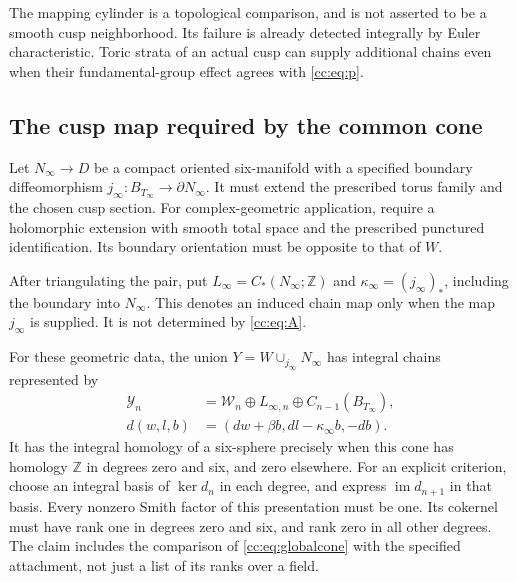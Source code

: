 The mapping cylinder is a topological comparison, and is not asserted
to be a smooth cusp neighborhood. Its failure is already detected
integrally by Euler characteristic. Toric strata of an actual cusp can
supply additional chains even when their fundamental-group effect
agrees with \eqref{cc:eq:p}.

\subsection{The cusp map required by the common cone}

Let $N_\infty\to D$ be a compact oriented six-manifold with a specified
boundary diffeomorphism $j_\infty:B_{T_\infty}\to\partial N_\infty$.
It must extend the prescribed torus family and the chosen cusp section.
For complex-geometric application, require a holomorphic extension with
smooth total space and the prescribed punctured identification.
Its boundary orientation must be opposite to that of $W$.

After triangulating the pair, put $L_\infty=C_*(N_\infty;\mathbb Z)$ and
$\kappa_\infty=(j_\infty)_*$, including the boundary into $N_\infty$.
This denotes an induced chain map only when the map $j_\infty$ is supplied.
It is not determined by \eqref{cc:eq:A}.

\begin{theorem}\label{cc:thm:conditional}
For these geometric data, the union $Y=W\cup_{j_\infty}N_\infty$ has integral
chains represented by
\begin{equation}\label{cc:eq:globalcone}
\begin{split}
\mathcal Y_n&=\mathcal W_n\oplus L_{\infty,n}\oplus C_{n-1}(B_{T_\infty}),\\
d(w,l,b)&=(dw+\beta b,dl-\kappa_\infty b,-db).
\end{split}
\end{equation}
It has the integral homology of a six-sphere precisely when this cone
has homology $\mathbb Z$ in degrees zero and six, and zero elsewhere.
For an explicit criterion, choose an integral basis of $\ker d_n$ in
each degree, and express $\operatorname{im}d_{n+1}$ in that basis.
Every nonzero Smith factor of this presentation must be one.
Its cokernel must have rank one in degrees zero and six, and rank zero
in all other degrees.
The claim includes the comparison of \eqref{cc:eq:globalcone} with the
specified attachment, not just a list of its ranks over a field.
\end{theorem}

